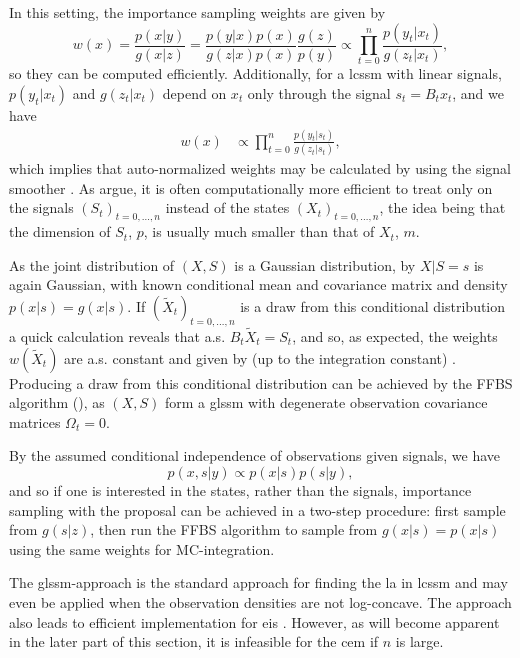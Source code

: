 In this setting, the importance sampling weights are given by 
$$
w(x) = \frac{p(x|y)}{g(x|z)} = \frac{p(y|x)p(x)}{g(z|x)p(x)} \frac{g(z)}{p(y)} \propto \prod_{t = 0}^n \frac{p(y_{t}|x_{t})}{g(z_{t}|x_{t})},
$$
so they can be computed efficiently. Additionally, for a \acrshort{lcssm} with linear signals, $p(y_{t}|x_{t})$ and $g(z_{t}|x_{t})$ depend on $x_{t}$ only through the signal $s_{t} = B_{t}x_{t}$, and we have 
\begin{align}
\label{eq:weights_only_on_signal}
w(x) &\propto \prod_{t = 0}^{n}\frac{p(y_{t}|s_{t})}{g(z_{t}|s_{t})},
\end{align}
which implies that auto-normalized weights may be calculated by using the signal smoother \cite[Theorem 2]{Jungbacker2007Monte}.
As \citeauthor{Durbin2012Time} \cite[Section 4.5.3]{Durbin2012Time} argue, it is often computationally more efficient to treat only on the signals $\left(S_{t}\right)_{t=0,\dots,n}$ instead of the states $ \left( X_{t}  \right)_{t = 0, \dots, n}$, the idea being that the dimension of $S_{t}$, $p$, is usually much smaller than that of $X_{t}$, $m$. 

As the joint distribution of $(X, S)$ is a Gaussian distribution, by  $X|S = s$ is again Gaussian,
with known conditional mean and covariance matrix and density $p(x|s) = g(x|s)$. If $(\tilde X_{t})_{t=0,\dots,n}$ is a draw from this conditional distribution a quick calculation reveals that a.s. $B_{t} \tilde X_{t} = S_{t}$, and so, as expected, the weights $w(\tilde X_{t})$ are a.s. constant and given by (up to the integration constant) . Producing a draw from this conditional distribution can be achieved by the FFBS algorithm (), as $(X, S)$ form a \gls{glssm} with degenerate observation covariance matrices $\Omega_{t} = 0$.

By the assumed conditional independence of observations given signals, we have
$$
p(x, s|y) \propto p(x|s) p(s|y),
$$
and so if one is interested in the states, rather than the signals, importance sampling with the proposal  can be achieved in a two-step procedure: first sample from $g(s|z)$, then run the FFBS algorithm to sample from $g(x|s) = p(x|s)$ using the same weights for MC-integration. 

The \gls{glssm}-approach is the standard approach for finding the \gls{la} in \gls{lcssm} \cite{Durbin1997Monte,Durbin2012Time} and may even be applied when the observation densities are not log-concave\cite{Jungbacker2007Monte}. The approach also leads to efficient implementation for \gls{eis} \cite{Koopman2019Modified}. However, as will become apparent in the later part of this section, it is infeasible for the \gls{cem} if $n$ is large. 


